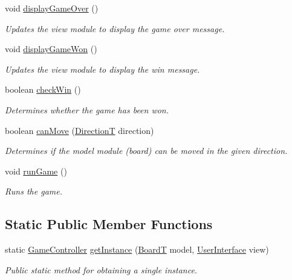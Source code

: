 \begin{DoxyCompactItemize}
\mbox{\label{classsrc_1_1GameController_a04a2c53fa3d059849545bddf0a8a6798}} 
void \hyperlink{classsrc_1_1GameController_a04a2c53fa3d059849545bddf0a8a6798}{display\+Game\+Over} ()
\begin{DoxyCompactList}\small\item\em Updates the view module to display the game over message. \end{DoxyCompactList}\item 
\mbox{\label{classsrc_1_1GameController_af11e64f609dc41aa38827f9839e8582f}} 
void \hyperlink{classsrc_1_1GameController_af11e64f609dc41aa38827f9839e8582f}{display\+Game\+Won} ()
\begin{DoxyCompactList}\small\item\em Updates the view module to display the win message. \end{DoxyCompactList}\item 
boolean \hyperlink{classsrc_1_1GameController_a5880a025234e64c5ca41a188c4223f19}{check\+Win} ()
\begin{DoxyCompactList}\small\item\em Determines whether the game has been won. \end{DoxyCompactList}\item 
boolean \hyperlink{classsrc_1_1GameController_aab620640062cc1e977a11d090af2ac46}{can\+Move} (\hyperlink{enumsrc_1_1DirectionT}{DirectionT} direction)
\begin{DoxyCompactList}\small\item\em Determines if the model module (board) can be moved in the given direction. \end{DoxyCompactList}\item 
void \hyperlink{classsrc_1_1GameController_ac77f1748a5500f840a22824b9c774f1d}{run\+Game} ()
\begin{DoxyCompactList}\small\item\em Runs the game. \end{DoxyCompactList}\end{DoxyCompactItemize}
\subsection*{Static Public Member Functions}
\begin{DoxyCompactItemize}
\item 
static \hyperlink{classsrc_1_1GameController}{Game\+Controller} \hyperlink{classsrc_1_1GameController_a16d38d4e6e0e349e3455b2f9ec24d275}{get\+Instance} (\hyperlink{classsrc_1_1BoardT}{BoardT} model, \hyperlink{classsrc_1_1UserInterface}{User\+Interface} view)
\begin{DoxyCompactList}\small\item\em Public static method for obtaining a single instance. \end{DoxyCompactList}\end{DoxyCompactItemize}


